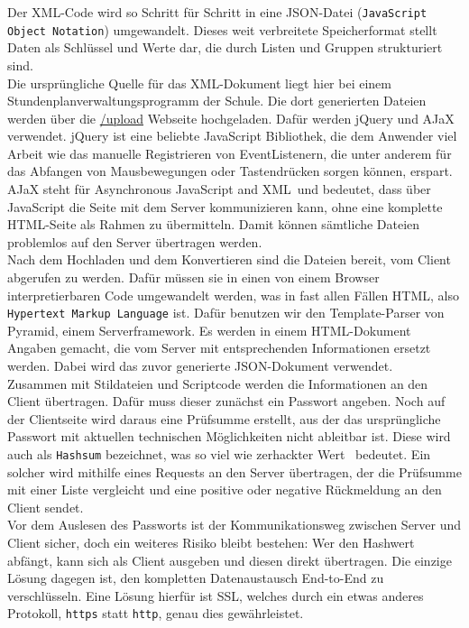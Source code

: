 Der XML-Code wird so Schritt für Schritt in eine JSON-Datei (\texttt{JavaScript Object Notation}) umgewandelt. Dieses weit verbreitete Speicherformat stellt Daten als Schlüssel und Werte dar, die durch Listen und Gruppen strukturiert sind.\\

Die ursprüngliche Quelle für das XML-Dokument liegt hier bei einem Stundenplanverwaltungsprogramm der Schule. Die dort generierten Dateien werden über die \url{/upload} Webseite hochgeladen. Dafür werden jQuery und AJaX verwendet. jQuery ist eine beliebte JavaScript Bibliothek, die dem Anwender viel Arbeit wie das manuelle Registrieren von EventListenern, die unter anderem für das Abfangen von Mausbewegungen oder Tastendrücken sorgen können, erspart. AJaX steht für \glqq Asynchronous JavaScript and XML\grqq\  und bedeutet, dass über JavaScript die Seite mit dem Server kommunizieren kann, ohne eine komplette HTML-Seite als Rahmen zu übermitteln. Damit können sämtliche Dateien problemlos auf den Server übertragen werden.\\

Nach dem Hochladen und dem Konvertieren sind die Dateien bereit, vom Client abgerufen zu werden. Dafür müssen sie in einen von einem Browser interpretierbaren Code umgewandelt werden, was in fast allen Fällen HTML, also \texttt{Hypertext Markup Language} ist. Dafür benutzen wir den Template-Parser von Pyramid, einem Serverframework. Es werden in einem HTML-Dokument Angaben gemacht, die vom Server mit entsprechenden Informationen ersetzt werden. Dabei wird das zuvor generierte JSON-Dokument verwendet.\\

Zusammen mit Stildateien und Scriptcode werden die Informationen an den Client übertragen. Dafür muss dieser zunächst ein Passwort angeben. Noch auf der Clientseite wird daraus eine Prüfsumme erstellt, aus der das ursprüngliche Passwort mit aktuellen technischen Möglichkeiten nicht ableitbar ist. Diese wird auch als \texttt{Hashsum} bezeichnet, was so viel wie \glqq zerhackter Wert \grqq\  bedeutet. Ein solcher wird mithilfe eines Requests an den Server übertragen, der die Prüfsumme mit einer Liste vergleicht und eine positive oder negative Rückmeldung an den Client sendet.\\

Vor dem Auslesen des Passworts ist der Kommunikationsweg zwischen Server und Client sicher, doch ein weiteres Risiko bleibt bestehen: Wer den Hashwert abfängt, kann sich als Client ausgeben und diesen direkt übertragen. Die einzige Lösung dagegen ist, den kompletten Datenaustausch End-to-End zu verschlüsseln. Eine Lösung hierfür ist SSL, welches durch ein etwas  anderes Protokoll, \texttt{https} statt \texttt{http}, genau dies gewährleistet.
